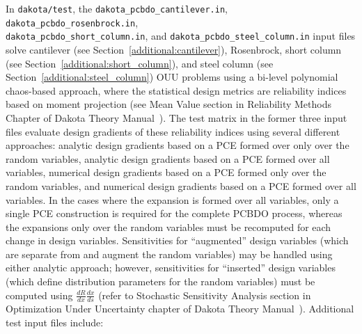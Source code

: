 In \texttt{dakota/test}, the \texttt{dakota\_pcbdo\_cantilever.in},
\texttt{dakota\_pcbdo\_rosenbrock.in},\\
\texttt{dakota\_pcbdo\_short\_column.in}, and
\texttt{dakota\_pcbdo\_steel\_column.in} input files solve cantilever
(see Section~\ref{additional:cantilever}), Rosenbrock, short column
(see Section~\ref{additional:short_column}), and steel column (see
Section~\ref{additional:steel_column}) OUU problems using a bi-level
polynomial chaos-based approach, where the statistical design metrics
are reliability indices based on moment projection (see Mean Value
section in Reliability Methods Chapter of Dakota Theory
Manual~\cite{TheoMan}).  The test matrix in the former three input
files evaluate design gradients of these reliability indices using
several different approaches: analytic design gradients based on a PCE
formed over only over the random variables, analytic design gradients
based on a PCE formed over all variables, numerical design gradients
based on a PCE formed only over the random variables, and numerical
design gradients based on a PCE formed over all variables.  In the
cases where the expansion is formed over all variables, only a single
PCE construction is required for the complete PCBDO process, whereas
the expansions only over the random variables must be recomputed for
each change in design variables.  Sensitivities for ``augmented''
design variables (which are separate from and augment the random
variables) may be handled using either analytic approach; however,
sensitivities for ``inserted'' design variables (which define
distribution parameters for the random variables) must be 
computed using $\frac{dR}{dx} \frac{dx}{ds}$ (refer to Stochastic
Sensitivity Analysis section in Optimization Under Uncertainty chapter
of Dakota Theory Manual~\cite{TheoMan}).  Additional test input files
include:
